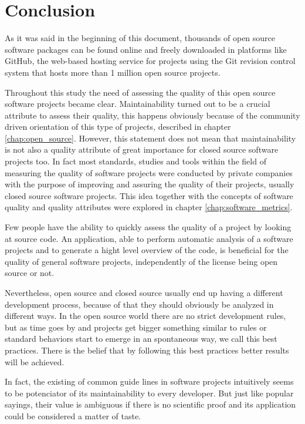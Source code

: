 \thispagestyle{empty}
\chapter{Conclusion}\label{chap:conclusion}


As it was said in the beginning of this document, thousands of open source software packages can be found online and 
freely downloaded in platforms like GitHub,
the web-based hosting service for projects using the Git revision control system that 
hosts more than 1 million open source projects.

Throughout this study the need of assessing the quality of this open source software projects became clear.
Maintainability turned out to be a crucial attribute to assess their quality, 
this happens obviously because of the community driven orientation of this type of projects, 
described in chapter \ref{chap:open_source}. 
However, this statement does not mean that maintainability is not also a quality attribute of great importance
for closed source software projects too. 
In fact most standards, studies and tools within the field of measuring the quality of software projects 
were conducted by private companies with the purpose of improving and assuring the quality of their projects,
usually closed source software projects. This idea together with the concepts of software quality and 
quality attributes were explored in chapter \ref{chap:software_metrics}.

Few people have the ability to quickly assess the quality of a project by looking at source code. 
An application, able to perform automatic analysis of a software projects and to generate a hight level overview of the code,
is beneficial for the quality of general software projects, independently of the license being open source or not.

Nevertheless, open source and closed source usually end up having a different development process, 
because of that they should obviously be analyzed in different ways.
In the open source world there are no strict development rules, 
but as time goes by and projects get bigger something similar to rules
or standard behaviors start to emerge in an spontaneous way, we call this best practices.
There is the belief that by following this best practices better results will be achieved.

In fact, the existing of common guide lines in software projects intuitively seems to be potenciator of its 
maintainability to every developer.
But just like popular sayings, their value is ambiguous if there is no scientific proof and 
its application could be considered a matter of taste.

